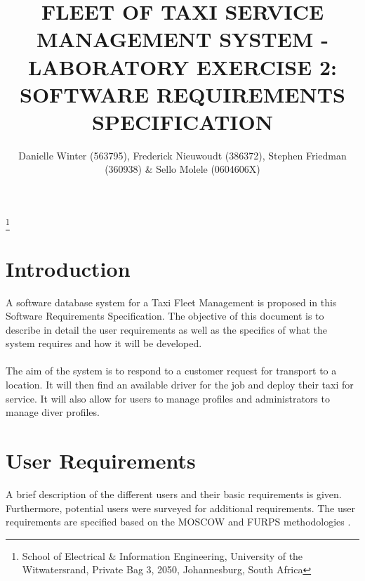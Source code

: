\documentclass[10pt,twocolumn]{witseiepaper}
\begin{document}
\title{FLEET OF TAXI SERVICE MANAGEMENT SYSTEM - LABORATORY EXERCISE 2: SOFTWARE REQUIREMENTS SPECIFICATION}

\author{Danielle Winter (563795), Frederick Nieuwoudt (386372), Stephen Friedman (360938) \& Sello Molele (0604606X)}
\thanks{School of Electrical \& Information Engineering, University of the
Witwatersrand, Private Bag 3, 2050, Johannesburg, South Africa}


%

\maketitle
\thispagestyle{empty}\pagestyle{empty}


%
\section{Introduction}
A software database system for a Taxi Fleet Management is proposed in this Software Requirements Specification. The objective of this document is to describe in detail the user requirements as well as the specifics of what the system requires and how it will be developed.\\\\
The aim of the system is to respond to a customer request for transport to a location. It will then find an available driver for the job and deploy their taxi for service. It will also allow for users to manage profiles and administrators to manage diver profiles.

\section{User Requirements}
A brief description of the different users and their basic requirements is given. Furthermore, potential users were surveyed for additional requirements. The user requirements are specified based on the MOSCOW and FURPS methodologies \cite{SoftwareEngTextbook}.
\end{document}
